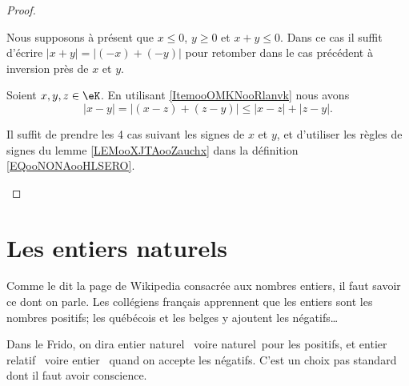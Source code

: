 \begin{proof}
\begin{subproof}
\begin{enumerate}
			      Nous supposons à présent que \( x\leq 0\), \( y\geq 0\) et \( x+y\leq 0\). Dans ce cas il suffit d'écrire \( | x+y |=| (-x)+(-y) |\) pour retomber dans le cas précédent à inversion près de \( x\) et \( y\).
		\end{enumerate}

		Soient \( x,y,z\in \eK\). En utilisant \ref{ItemooOMKNooRlanvk} nous avons
		\begin{equation}
			| x-y |= |  (x-z)+(z-y) |\leq | x-z |+| z-y |.
		\end{equation}

		Il suffit de prendre les 4 cas suivant les signes de \( x\) et \( y\), et d'utiliser les règles de signes du lemme \ref{LEMooXJTAooZauchx} dans la définition \eqref{EQooNONAooHLSERO}.
	\end{subproof}
\end{proof}




\section{Les entiers naturels}
\label{SECooPJSYooNYaIaq}

\begin{normaltext}	\label{NORMooEntierNaturel}
	Comme le dit la page de Wikipedia consacrée aux nombres entiers, il faut savoir ce dont on parle. Les collégiens français apprennent que les entiers sont les nombres positifs; les québécois et les belges y ajoutent les négatifs\dots

 	Dans le Frido, on dira \og entier naturel \fg\ voire \og naturel\fg\ pour les positifs, et \og entier relatif \fg\ voire \og entier \fg\ quand on accepte les négatifs. C'est un choix pas standard dont il faut avoir conscience.
\end{normaltext}

